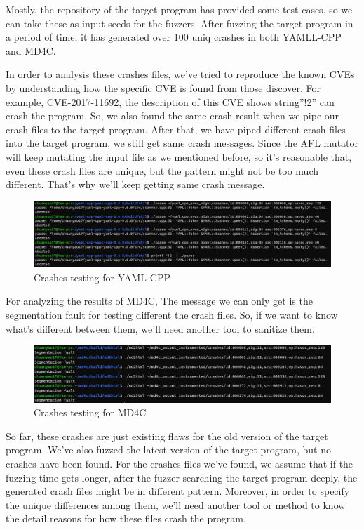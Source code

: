\documentclass[12pt]{diazessay}
\begin{document}
Mostly, the repository of the target program has provided some test cases, so we can take these as input seeds for the fuzzers.
After fuzzing the target program in a period of time, it has generated over 100 uniq crashes in both YAMLL-CPP and MD4C. 


In order to analysis these crashes files, we’ve tried to reproduce the known CVEs by understanding how the specific CVE is found from those discover.
For example, CVE-2017-11692\cite{CVE-2017-11692}, the description of this CVE shows string”!2” can crash the program.
So, we also found the same crash result when we pipe our crash files to the target program.
After that, we have piped different crash files into the target program, we still get same crash messages.
Since the AFL mutator will keep mutating the input file as we mentioned before, so it’s reasonable that, even these crash files are unique, but the pattern might not be too much different. That’s why we’ll keep getting same crash message.

\begin{figure}
	\centering
	\includegraphics[scale=0.5, trim={0 3cm 0 0}, clip]{yaml_cpp_crashes.jpg}
	\caption{Crashes testing for YAML-CPP}
\end{figure}

For analyzing the results of MD4C, The message we can only get is the segmentation fault for testing different the crash files. So, if we want to know what’s different between them, we’ll need another tool to sanitize them.
\begin{figure}
	\centering
	\includegraphics[scale=0.5, trim={0 3cm 0 0}, clip]{md4c_crashes.jpg}
	\caption{Crashes testing for MD4C}
\end{figure}
So far, these crashes are just existing flaws for the old version of the target program. We've also fuzzed the latest version of the target program, but no crashes have been found.
For the crashes files we've found, we assume that if the fuzzing time gets longer, after the fuzzer searching the target program deeply, the generated crash files might be in different pattern. Moreover, in order to specify the unique differences among them, we’ll need another tool or method to know the detail reasons for how these files crash the program.
\end{document}
